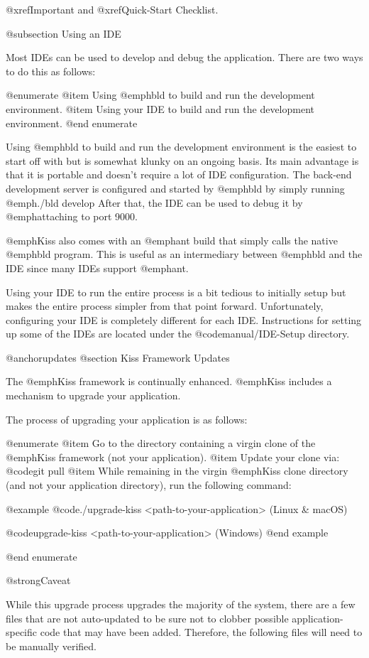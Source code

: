 @xref{Important} and @xref{Quick-Start Checklist}.

@subsection Using an IDE

Most IDEs can be used to develop and debug the application.  There are two
ways to do this as follows:

@enumerate
@item
Using @emph{bld} to build and run the development environment.
@item
Using your IDE to build and run the development environment.
@end enumerate

Using @emph{bld} to build and run the development environment is the
easiest to start off with but is somewhat klunky on an ongoing basis.
Its main advantage is that it is portable and doesn't require a lot of
IDE configuration.  The back-end development server is configured and
started by @emph{bld} by simply running @emph{./bld develop} After
that, the IDE can be used to debug it by @emph{attaching} to port
9000.

@emph{Kiss} also comes with an @emph{ant} build that simply calls the
native @emph{bld} program.  This is useful as an intermediary between
@emph{bld} and the IDE since many IDEs support @emph{ant}.

Using your IDE to run the entire process is a bit tedious to initially
setup but makes the entire process simpler from that point forward.
Unfortunately, configuring your IDE is completely different for each
IDE.  Instructions for setting up some of the IDEs are located under the
@code{manual/IDE-Setup} directory.


@anchor{updates} @section Kiss Framework Updates

The @emph{Kiss} framework is continually enhanced.  @emph{Kiss}
includes a mechanism to upgrade your application. 

The process of upgrading your application is as follows:

@enumerate
@item
Go to the directory containing a virgin clone of the @emph{Kiss} framework (not your application).
@item
Update your clone via: @code{git pull}
@item
While remaining in the virgin @emph{Kiss} clone directory (and not your application directory),
run the following command:  

@example
@code{./upgrade-kiss <path-to-your-application>} (Linux & macOS)

@code{upgrade-kiss <path-to-your-application>} (Windows)
@end example

@end enumerate

@strong{Caveat}

While this upgrade process upgrades the majority of the system, there
are a few files that are not auto-updated to be sure not to clobber
possible application-specific code that may have been added.
Therefore, the following files will need to be manually verified.

